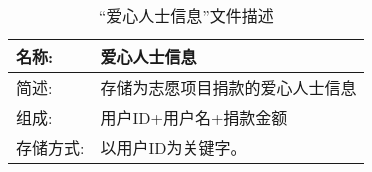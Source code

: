 
\begin{table}[H]  
\caption{``爱心人士信息”文件描述}  
\begin{center}  
    \begin{tabular}{l p{11cm}} 
        \hline
        \quad 名称:  &   爱心人士信息 \\
        \hline
        \quad 简述:  & 存储为志愿项目捐款的爱心人士信息\\
        \hline
        \quad 组成:  & 用户ID+用户名+捐款金额 \\
        \hline
        \quad 存储方式:  & 以用户ID为关键字。 \\
        \hline
    \end{tabular}
    \label{tab1}
\end{center}
\end{table}
